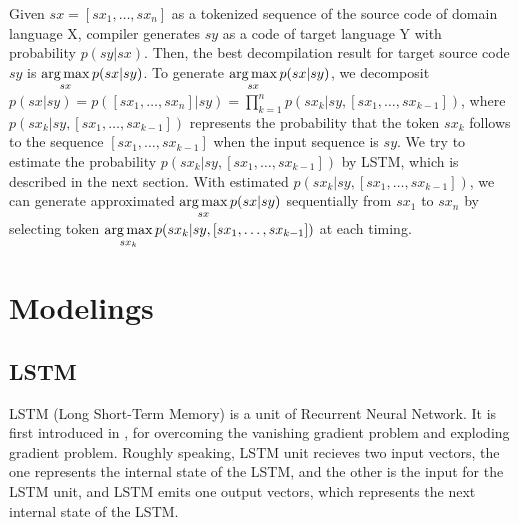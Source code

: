 \documentclass[senior,final,11pt]{iscs-thesis}
\newcommand{\argmax}{\mathop{\rm arg\,max}\limits}
\begin{document}
Given $sx = [sx_1, \dots, sx_n] $ as a tokenized sequence of the source code of domain language X, compiler generates $sy$ as a code of target language Y with probability $p(sy|sx)$.
Then, the best decompilation result for target source code $sy$ is $ \argmax_{sx} p(sx|sy)$. 
To generate $ \argmax_{sx} p(sx|sy)$, we decomposit $ p(sx|sy) = p([sx_1, \dots, sx_n] |sy) = \prod_{k=1}^{n} p(sx_k|sy,[sx_1,\dots,sx_{k-1}]) $,
where $ p(sx_k|sy,[sx_1,\dots,sx_{k-1}]) $ represents the probability that the token $ sx_k $ follows to the sequence $ [sx_1,\dots,sx_{k-1}] $ 
when the input sequence is $ sy $. 
We try to estimate the probability $ p(sx_k|sy,[sx_1,\dots,sx_{k-1}]) $ by LSTM, which is described in the next section.
With estimated $ p(sx_k|sy,[sx_1,\dots,sx_{k-1}]) $, we can generate approximated $ \argmax_{sx} p(sx|sy)$ sequentially from $sx_1$ to $sx_n$ by selecting token $ \argmax_{sx_{k}} p(sx_k|sy,[sx_1,\dots,sx_{k-1}]) $ at each timing.



\section{Modelings}

\subsection{LSTM}
LSTM (Long Short-Term Memory) is a unit of Recurrent Neural Network. 
It is first introduced in \cite{first_LSTM}, for overcoming the vanishing gradient problem and exploding gradient problem.
Roughly speaking, LSTM unit recieves two input vectors, 
the one represents the internal state of the LSTM, and the other is the input for the LSTM unit, 
and LSTM emits one output vectors, which represents the next internal state of the LSTM.
\end{document}

